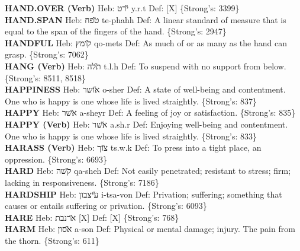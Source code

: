 {\textbf{HAND.OVER (Verb)} Heb: {\large\H ירט} y.r.t Def: {[}X{]} \{Strong's: 3399\}\hfill{}\\

\textbf{HAND.SPAN} Heb: {\large\H טפח} te-phahh Def: A linear standard of measure that is equal to the span of the fingers of the hand. \{Strong's: 2947\}\hfill{}\\

\textbf{HANDFUL} Heb: {\large\H קומץ} qo-mets Def: As much of or as many as the hand can grasp. \{Strong's: 7062\}\hfill{}\\

\textbf{HANG (Verb)} Heb: {\large\H תלה} t.l.h Def: To suspend with no support from below. \{Strong's: 8511, 8518\}\hfill{}\\

\textbf{HAPPINESS} Heb: {\large\H אושר} o-sher Def: A state of well-being and contentment. One who is happy is one whose life is lived straightly. \{Strong's: 837\}\hfill{}\\

\textbf{HAPPY} Heb: {\large\H אשר} a-sheyr Def: A feeling of joy or satisfaction. \{Strong's: 835\}\hfill{}\\

\textbf{HAPPY (Verb)} Heb: {\large\H אשר} a.sh.r Def: Enjoying well-being and contentment. One who is happy is one whose life is lived straightly. \{Strong's: 833\}\hfill{}\\

\textbf{HARASS (Verb)} Heb: {\large\H צוך} ts.w.k Def: To press into a tight place, an oppression. \{Strong's: 6693\}\hfill{}\\

\textbf{HARD} Heb: {\large\H קשה} qa-sheh Def: Not easily penetrated; resistant to stress; firm; lacking in responsiveness. \{Strong's: 7186\}\hfill{}\\

\textbf{HARDSHIP} Heb: {\large\H עיצבון} i-tsa-von Def: Privation; suffering; something that causes or entails suffering or privation. \{Strong's: 6093\}\hfill{}\\

\textbf{HARE} Heb: {\large\H ארנבת} {[}X{]} Def: {[}X{]} \{Strong's: 768\}\hfill{}\\

\textbf{HARM} Heb: {\large\H אסון} a-son Def: Physical or mental damage; injury. The pain from the thorn. \{Strong's: 611\}\hfill{}\\

}
